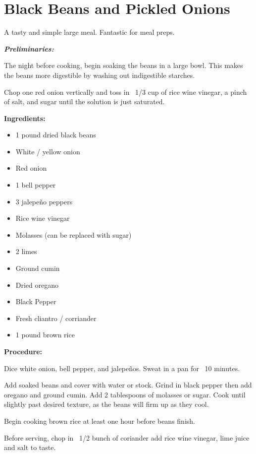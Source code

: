 \section{Black Beans and Pickled Onions} %
A tasty and simple large meal. Fantastic for meal preps.

\textbf{\large{\emph{Preliminaries:}}}

The night before cooking, begin soaking the beans in a large bowl. This makes the beans more digestible by washing out indigestible starches.

Chop one red onion vertically and toss in ~1/3 cup of rice wine vinegar, a pinch of salt, and sugar until the solution is just saturated.

\begin{multicols}{2}\raggedcolumns
\textbf{Ingredients:}

\begin{itemize}
	\item 1 pound dried black beans
	\item White / yellow onion
	\item Red onion
	\item 1 bell pepper
	\item 3 jalepeño peppers
	\item Rice wine vinegar
	\item Molasses (can be replaced with sugar)
	\item 2 limes
	\item Ground cumin
	\item Dried oregano
	\item Black Pepper
	\item Fresh cliantro / corriander
	\item 1 pound brown rice
\end{itemize}

\columnbreak

\textbf{Procedure:}

Dice white onion, bell pepper, and jalepeños. Sweat in a pan for ~10 minutes.

Add soaked beans and cover with water or stock. Grind in black pepper then add oregano and ground cumin.
Add 2 tablespoons of molasses or sugar. Cook until slightly past desired texture, as the beans will firm up as they cool.

Begin cooking brown rice at least one hour before beans finish.

Before serving, chop in ~1/2 bunch of coriander add rice wine vinegar, lime juice and salt to taste.

\end{multicols}
